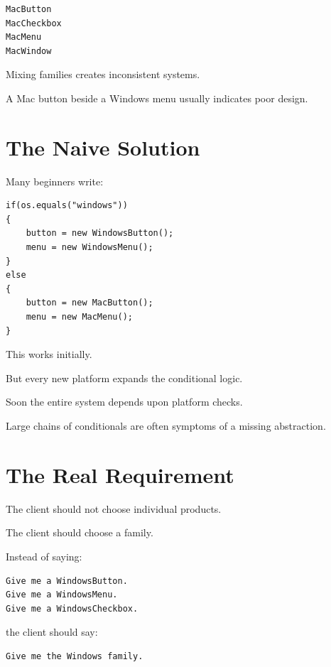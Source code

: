 \documentclass[11pt,a4paper]{book}
\begin{document}
\begin{verbatim}
MacButton
MacCheckbox
MacMenu
MacWindow
\end{verbatim}

\begin{trap}

Mixing families creates inconsistent systems.

A Mac button beside a Windows menu
usually indicates poor design.

\end{trap}
\section{The Naive Solution}

Many beginners write:

\begin{verbatim}
if(os.equals("windows"))
{
    button = new WindowsButton();
    menu = new WindowsMenu();
}
else
{
    button = new MacButton();
    menu = new MacMenu();
}
\end{verbatim}

This works initially.

But every new platform expands the conditional logic.

Soon the entire system depends upon platform checks.

\begin{trap}

Large chains of conditionals are often symptoms
of a missing abstraction.

\end{trap}
\section{The Real Requirement}

\begin{idea}

The client should not choose individual products.

The client should choose a family.

\end{idea}

Instead of saying:

\begin{verbatim}
Give me a WindowsButton.
Give me a WindowsMenu.
Give me a WindowsCheckbox.
\end{verbatim}

the client should say:

\begin{verbatim}
Give me the Windows family.
\end{verbatim}
\end{document}
